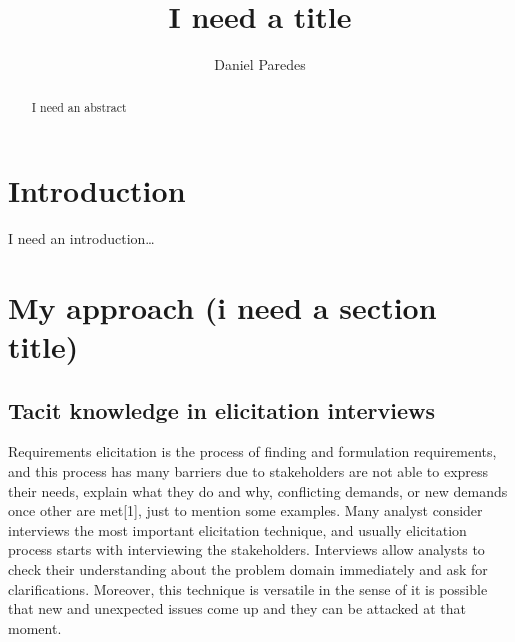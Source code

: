 \documentclass[]{llncs}
\institute{FH Dortmund, \\ \texttt{}}
\title{I need a title}
\author{Daniel Paredes}
\date{}
\begin{document}
\maketitle
\begin{abstract}
I need an abstract


\end{abstract}

\hypertarget{introduction}{%
\section{Introduction}\label{introduction}}

I need an introduction\ldots{}

\hypertarget{my-approach-i-need-a-section-title}{%
\section{My approach (i need a section
title)}\label{my-approach-i-need-a-section-title}}

\hypertarget{tacit-knowledge-in-elicitation-interviews}{%
\subsection{Tacit knowledge in elicitation
interviews}\label{tacit-knowledge-in-elicitation-interviews}}

Requirements elicitation is the process of finding and formulation
requirements, and this process has many barriers due to stakeholders are
not able to express their needs, explain what they do and why,
conflicting demands, or new demands once other are met{[}1{]}, just to
mention some examples. Many analyst consider interviews the most
important elicitation technique, and usually elicitation process starts
with interviewing the stakeholders. Interviews allow analysts to check
their understanding about the problem domain immediately and ask for
clarifications. Moreover, this technique is versatile in the sense of it
is possible that new and unexpected issues come up and they can be
attacked at that moment.
\end{document}
